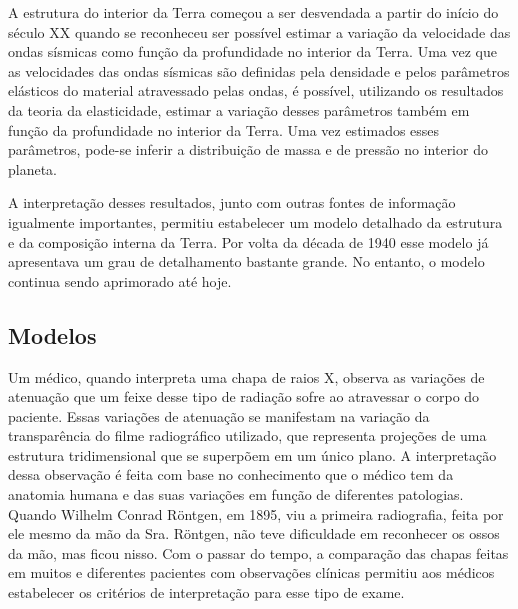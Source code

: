 \documentclass[]{book}
\theoremstyle{definition}
\theoremstyle{definition}
\theoremstyle{definition}
\theoremstyle{remark}
\begin{document}
A estrutura do interior da Terra começou a ser desvendada a partir do início do século XX quando se reconheceu ser possível estimar a variação da velocidade das ondas sísmicas como função da profundidade no interior da Terra. Uma vez que as velocidades das ondas sísmicas são definidas pela densidade e pelos parâmetros elásticos do material atravessado pelas ondas, é possível, utilizando os resultados da teoria da elasticidade, estimar a variação desses parâmetros também em função da profundidade no interior da Terra. Uma vez estimados esses parâmetros, pode-se inferir a distribuição de massa e de pressão no interior do planeta.

A interpretação desses resultados, junto com outras fontes de informação igualmente importantes, permitiu estabelecer um modelo detalhado da estrutura e da composição interna da Terra. Por volta da década de 1940 esse modelo já apresentava um grau de detalhamento bastante grande. No entanto, o modelo continua sendo aprimorado até hoje.

\hypertarget{modelos}{%
\subsection{Modelos}\label{modelos}}

Um médico, quando interpreta uma chapa de raios X, observa as variações de atenuação que um feixe desse tipo de radiação sofre ao atravessar o corpo do paciente. Essas variações de atenuação se manifestam na variação da transparência do filme radiográfico utilizado, que representa projeções de uma estrutura tridimensional que se superpõem em um único plano. A interpretação dessa observação é feita com base no conhecimento que o médico tem da anatomia humana e das suas variações em função de diferentes patologias. Quando Wilhelm Conrad Röntgen, em 1895, viu a primeira radiografia, feita por ele mesmo da mão da Sra. Röntgen, não teve dificuldade em reconhecer os ossos da mão, mas ficou nisso. Com o passar do tempo, a comparação das chapas feitas em muitos e diferentes pacientes com observações clínicas permitiu aos médicos estabelecer os critérios de interpretação para esse tipo de exame.
\end{document}
